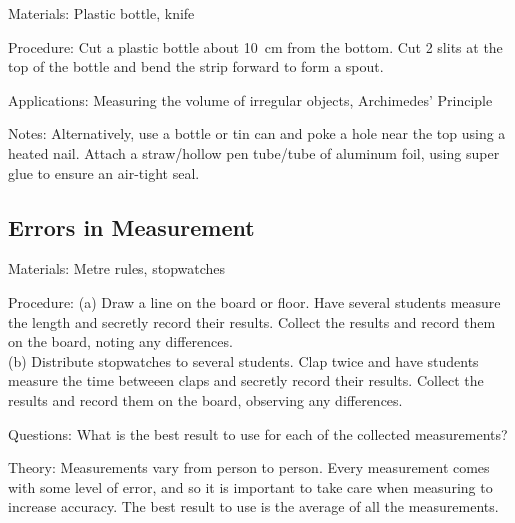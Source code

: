 \begin{multicols}{2}
\begin{description*}
\item[Materials:]{Plastic bottle, knife}
\item[Procedure:]{Cut a plastic bottle about 10~cm from the bottom. Cut 2 slits at the top of the bottle and bend the strip forward to form a spout.}
\item[Applications:]{Measuring the volume of irregular objects, Archimedes' Principle}
\item[Notes:]{Alternatively, use a bottle or tin can and poke a hole near the top using a heated nail. Attach a straw/hollow pen tube/tube of aluminum foil, using super glue to ensure an air-tight seal.}
\end{description*}

\columnbreak

\subsection{Errors in Measurement}
\label{sub:meas-errors}

\begin{description*}
\item[Materials:]{Metre rules, stopwatches}
\item[Procedure:]{(a) Draw a line on the board or floor. Have several students measure the length and secretly record their results. Collect the results and record them on the board, noting any differences.\\(b) Distribute stopwatches to several students. Clap twice and have students measure the time betweeen claps and secretly record their results. Collect the results and record them on the board, observing any differences.}
\item[Questions:]{What is the best result to use for each of the collected measurements?}
\item[Theory:]{Measurements vary from person to person. Every measurement comes with some level of error, and so it is important to take care when measuring to increase accuracy. The best result to use is the average of all the measurements.}
\end{description*}


\end{multicols}
